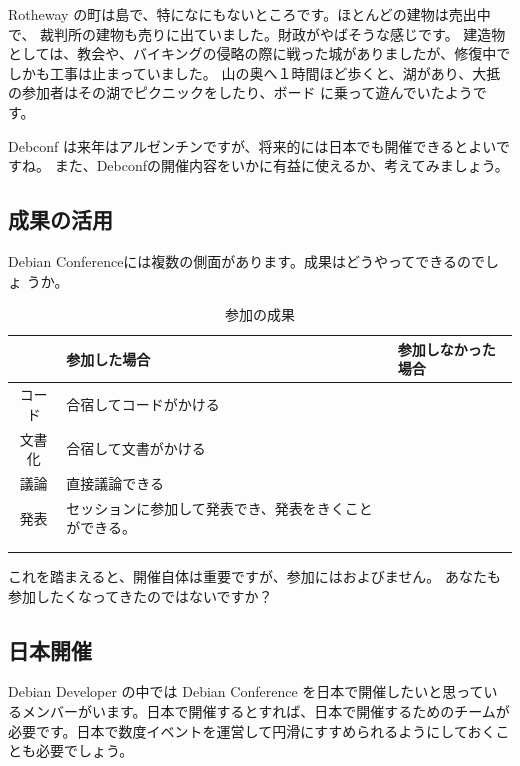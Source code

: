 \documentclass[mingoth,a4paper]{jsarticle}
\begin{document}
Rotheway の町は島で、特になにもないところです。ほとんどの建物は売出中で、
裁判所の建物も売りに出ていました。財政がやばそうな感じです。
建造物としては、教会や、バイキングの侵略の際に戦った城がありましたが、修復中でしかも工事は止まっていました。
山の奥へ１時間ほど歩くと、湖があり、大抵の参加者はその湖でピクニックをしたり、ボード
に乗って遊んでいたようです。

\label{sec:debconfplanning}


Debconf は来年はアルゼンチンですが、将来的には日本でも開催できるとよいで
すね。
また、Debconfの開催内容をいかに有益に使えるか、考えてみましょう。


\subsection{成果の活用}

Debian Conferenceには複数の側面があります。成果はどうやってできるのでしょ
うか。

\begin{table}[H]
\caption{参加の成果}
\label{tab:framework}
\begin{center}
{\LARGE
  \begin{tabularx}{\hsize}{|c|X|X|}
 \hline
 & 参加した場合 & 参加しなかった場合 \\
 \hline
 コード	& 合宿してコードがかける &  \\
 \hline
 文書化	& 合宿して文書がかける&  \\
 \hline
 議論 	& 直接議論できる &  \\
 \hline
 発表 	& セッションに参加して発表でき、発表をきくことができる。 &  \\
 \hline
&&\\
 \hline
&&\\
 \hline
 \end{tabularx}
}
\end{center} 
\end{table}

これを踏まえると、開催自体は重要ですが、参加にはおよびません。
あなたも参加したくなってきたのではないですか？

\subsection{日本開催}

Debian Developer の中では Debian Conference を日本で開催したいと思ってい
るメンバーがいます。日本で開催するとすれば、日本で開催するためのチームが
必要です。日本で数度イベントを運営して円滑にすすめられるようにしておくこ
とも必要でしょう。
\end{document}
